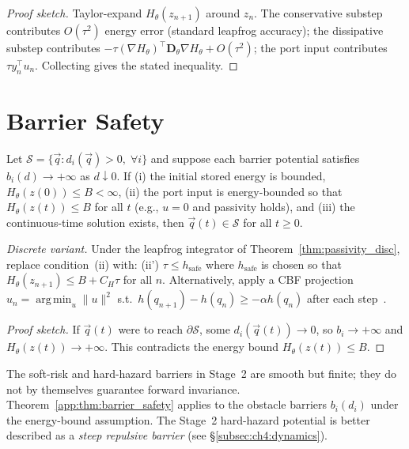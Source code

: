 \begin{proof}[Proof sketch]
Taylor-expand $H_\theta(z_{n+1})$ around $z_n$.
The conservative substep contributes $O(\tau^2)$ energy error
(standard leapfrog accuracy); the dissipative substep contributes
$-\tau(\nabla H_\theta)^\top\mathbf{D}_\theta\nabla H_\theta + O(\tau^2)$;
the port input contributes $\tau y_n^\top u_n$.
Collecting gives the stated inequality.
\end{proof}

\section{Barrier Safety}
\label{app:safety}

\begin{theorem}
\label{app:thm:barrier_safety}
Let $\mathcal{S} = \{\vec{q}: d_i(\vec{q})>0,\;\forall i\}$ and
suppose each barrier potential satisfies $b_i(d)\to+\infty$ as
$d\downarrow 0$.
If (i) the initial stored energy is bounded, $H_\theta(z(0))\leq B<\infty$,
(ii) the port input is energy-bounded so that $H_\theta(z(t))\leq B$
for all $t$ (e.g., $u=0$ and passivity holds), and (iii) the
continuous-time solution exists, then $\vec{q}(t)\in\mathcal{S}$
for all $t\geq 0$.

\noindent\textit{Discrete variant.}
Under the leapfrog integrator of Theorem~\ref{thm:passivity_disc},
replace condition~(ii) with: (ii') $\tau\leq h_{\mathrm{safe}}$
where $h_{\mathrm{safe}}$ is chosen so that $H_\theta(z_{n+1})\leq
B + C_H\tau$ for all $n$.
Alternatively, apply a CBF projection
$\hat u_n = \operatorname*{arg\,min}_u \|u\|^2$ s.t.\
$h(q_{n+1}) - h(q_n) \geq -\alpha h(q_n)$ after each step~\citep{ames2016control}.
\end{theorem}

\begin{proof}[Proof sketch]
If $\vec{q}(t)$ were to reach $\partial\mathcal{S}$, some
$d_i(\vec{q}(t))\to 0$, so $b_i\to+\infty$ and
$H_\theta(z(t))\to+\infty$.
This contradicts the energy bound $H_\theta(z(t))\leq B$.
\end{proof}

\begin{remark}
The soft-risk and hard-hazard barriers in Stage~2 are smooth but
finite; they do not by themselves guarantee forward invariance.
Theorem~\ref{app:thm:barrier_safety} applies to the obstacle barriers
$b_i(d_i)$ under the energy-bound assumption.
The Stage~2 hard-hazard potential is better described as a
\emph{steep repulsive barrier} (see §\ref{subsec:ch4:dynamics}).
\end{remark}

